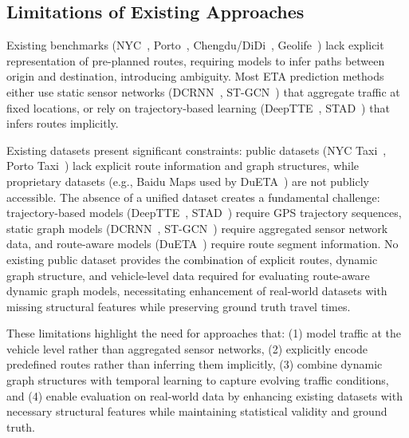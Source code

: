 \subsection{Limitations of Existing Approaches}

Existing benchmarks (NYC~\cite{nyc_tlc}, Porto~\cite{moreira2013porto}, Chengdu/DiDi~\cite{didi2016}, Geolife~\cite{zheng2012geolife}) lack explicit representation of pre-planned routes, requiring models to infer paths between origin and destination, introducing ambiguity. Most ETA prediction methods either use static sensor networks (DCRNN~\cite{dcrnn2018}, ST-GCN~\cite{yu2018stgcn}) that aggregate traffic at fixed locations, or rely on trajectory-based learning (DeepTTE~\cite{deepTTE2018}, STAD~\cite{abbar2020stad}) that infers routes implicitly.

Existing datasets present significant constraints: public datasets (NYC Taxi~\cite{nyc_tlc}, Porto Taxi~\cite{moreira2013porto}) lack explicit route information and graph structures, while proprietary datasets (e.g., Baidu Maps used by DuETA~\cite{dueta2023}) are not publicly accessible. The absence of a unified dataset creates a fundamental challenge: trajectory-based models (DeepTTE~\cite{deepTTE2018}, STAD~\cite{abbar2020stad}) require GPS trajectory sequences, static graph models (DCRNN~\cite{dcrnn2018}, ST-GCN~\cite{yu2018stgcn}) require aggregated sensor network data, and route-aware models (DuETA~\cite{dueta2023}) require route segment information. No existing public dataset provides the combination of explicit routes, dynamic graph structure, and vehicle-level data required for evaluating route-aware dynamic graph models, necessitating enhancement of real-world datasets with missing structural features while preserving ground truth travel times.

These limitations highlight the need for approaches that: (1) model traffic at the vehicle level rather than aggregated sensor networks, (2) explicitly encode predefined routes rather than inferring them implicitly, (3) combine dynamic graph structures with temporal learning to capture evolving traffic conditions, and (4) enable evaluation on real-world data by enhancing existing datasets with necessary structural features while maintaining statistical validity and ground truth.


